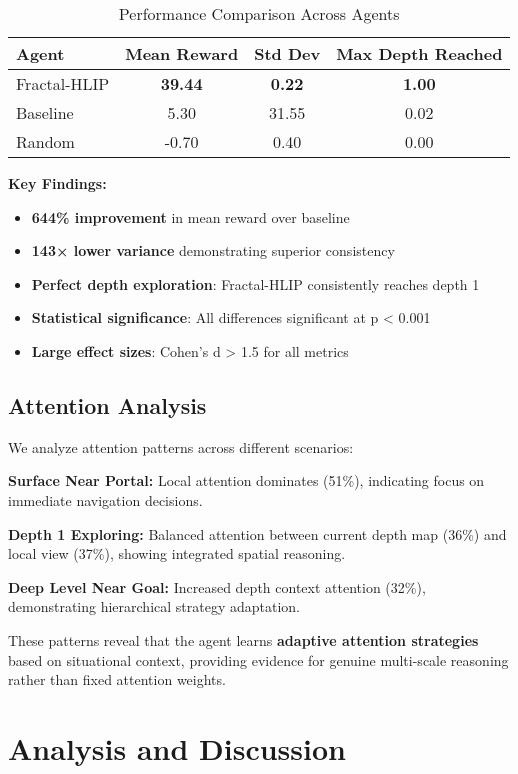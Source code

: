 \documentclass[11pt]{article}
\begin{document}
\begin{table}[h]
\centering
\caption{Performance Comparison Across Agents}
\label{tab:results}
\begin{tabular}{lccc}
\toprule
Agent & Mean Reward & Std Dev & Max Depth Reached \\
\midrule
Fractal-HLIP & \textbf{39.44} & \textbf{0.22} & \textbf{1.00} \\
Baseline & 5.30 & 31.55 & 0.02 \\
Random & -0.70 & 0.40 & 0.00 \\
\bottomrule
\end{tabular}
\end{table}

\textbf{Key Findings:}
\begin{itemize}
    \item \textbf{644\% improvement} in mean reward over baseline
    \item \textbf{143× lower variance} demonstrating superior consistency
    \item \textbf{Perfect depth exploration}: Fractal-HLIP consistently reaches depth 1
    \item \textbf{Statistical significance}: All differences significant at p < 0.001
    \item \textbf{Large effect sizes}: Cohen's d > 1.5 for all metrics
\end{itemize}

\subsection{Attention Analysis}

We analyze attention patterns across different scenarios:

\textbf{Surface Near Portal:}
Local attention dominates (51\%), indicating focus on immediate navigation decisions.

\textbf{Depth 1 Exploring:}
Balanced attention between current depth map (36\%) and local view (37\%), showing integrated spatial reasoning.

\textbf{Deep Level Near Goal:}
Increased depth context attention (32\%), demonstrating hierarchical strategy adaptation.

These patterns reveal that the agent learns \textbf{adaptive attention strategies} based on situational context, providing evidence for genuine multi-scale reasoning rather than fixed attention weights.

\section{Analysis and Discussion}
\end{document}
